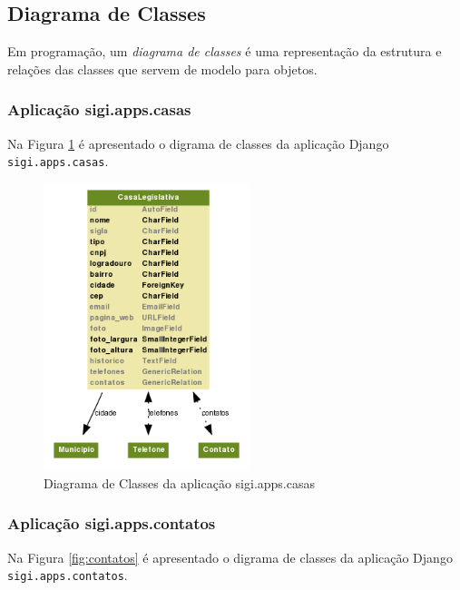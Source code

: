 \subsection{Diagrama de Classes}
Em programação, um \emph{diagrama de classes} é uma representação da
estrutura e relações das classes que servem de modelo para objetos.

\subsubsection{Aplicação sigi.apps.casas}
Na Figura \ref{fig:casas} é apresentado o digrama de classes da
aplicação Django \verb|sigi.apps.casas|.

\begin{figure}[h]
  \centering
  \includegraphics[width=60mm]{../imagens/casas.png}
  \caption{Diagrama de Classes da aplicação sigi.apps.casas}
  \label{fig:casas}
\end{figure}

\subsubsection{Aplicação sigi.apps.contatos}
Na Figura \ref{fig:contatos} é apresentado o digrama de classes da
aplicação Django \verb|sigi.apps.contatos|.


